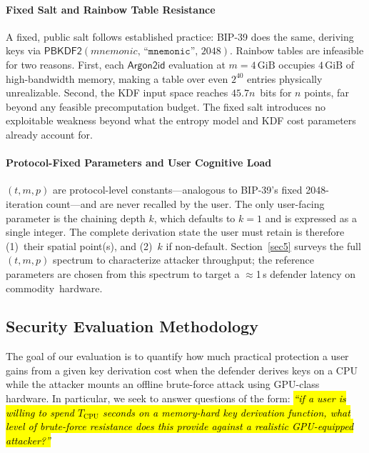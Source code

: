 \documentclass[mathematics,article,accept,pdftex,moreauthors]{Definitions/mdpi}
\begin{document}
\paragraph*{Fixed Salt and Rainbow Table Resistance} 

{A fixed, public salt follows established practice: BIP-39 does the same, deriving keys via $\mathsf{PBKDF2}(\textit{mnemonic},\,\texttt{``mnemonic''},\,2048)$. Rainbow tables are infeasible for two reasons. First, each $\mathsf{Argon2id}$ evaluation at $m=4\,\mathrm{GiB}$ occupies $4\,\mathrm{GiB}$ of high-bandwidth memory, making a table over even $2^{40}$ entries physically unrealizable. Second, the KDF input space reaches $45.7n$~bits for $n$ points, far beyond any feasible precomputation budget. The fixed salt introduces no exploitable weakness beyond what the entropy model and KDF cost parameters already account for.}

\paragraph*{Protocol-Fixed Parameters and User Cognitive Load}

{$(t, m, p)$ are protocol-level constants---analogous to BIP-39's fixed 2048-iteration \linebreak{}count---and are never recalled by the user. The only user-facing parameter is the chaining depth $k$, which defaults to $k=1$ and is expressed as a single integer. The complete derivation state the user must retain is therefore (1)~their spatial point(s), and (2)~$k$ if non-default. Section~\ref{sec5} surveys the full $(t, m, p)$ spectrum to characterize attacker throughput; the reference parameters are chosen from this spectrum to target a $\approx$1\,s defender latency on \mbox{commodity hardware.}}


\subsection{Security Evaluation Methodology}
\label{sec:security_evaluation}

The goal of our evaluation is to quantify how much practical protection a user gains from a given key derivation cost when the defender derives keys on a CPU while the attacker mounts an offline brute-force attack using GPU-class hardware. In particular, we seek to answer questions of the form: \emph{\hl{``if a user is willing to spend $T_{\text{CPU}}$ seconds on a memory-hard key derivation function, what level of brute-force resistance does this provide against a realistic GPU-equipped attacker?''} %
}
\end{document}
